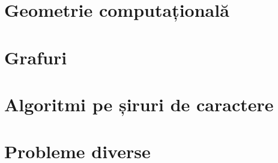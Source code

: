 \documentclass[12pt,openany]{book}
\begin{document}
\part{Geometrie computațională}






\part{Grafuri}
















\part{Algoritmi pe șiruri de caractere}

\begingroup












\endgroup

\part{Probleme diverse}















\end{document}
